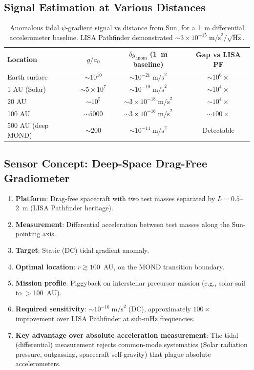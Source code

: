 \documentclass[11pt]{article}
\theoremstyle{definition}
\theoremstyle{remark}
\newcommand{\ee}[1]{\times10^{#1}}
\begin{document}
\subsection{Signal Estimation at Various Distances}

\begin{table}[H]
\centering
\small
\begin{tabular}{@{}lccc@{}}
\toprule
Location & $g/a_0$ & $\delta g_{\mathrm{anom}}$
  (1~m baseline) & Gap vs LISA PF \\
\midrule
Earth surface & $\sim 10^{10}$ & $\sim 10^{-21}\;\mathrm{m/s}^2$
  & $\sim 10^{6}\times$ \\
1 AU (Solar) & $\sim 5\ee{7}$ & $\sim 10^{-19}\;\mathrm{m/s}^2$
  & $\sim 10^{4}\times$ \\
20 AU & $\sim 10^{5}$ & $\sim 3\ee{-18}\;\mathrm{m/s}^2$
  & $\sim 10^{4}\times$ \\
100 AU & $\sim 5000$ & $\sim 3\ee{-16}\;\mathrm{m/s}^2$
  & $\sim 100\times$ \\
500 AU (deep MOND) & $\sim 200$ & $\sim 10^{-14}\;\mathrm{m/s}^2$
  & Detectable \\
\bottomrule
\end{tabular}
\caption{Anomalous tidal $\psi$-gradient signal vs distance from Sun,
  for a 1~m differential accelerometer baseline.  LISA Pathfinder
  demonstrated $\sim 3\ee{-15}\;\mathrm{m/s}^2/\sqrt{\mathrm{Hz}}$.}
\label{tab:tidal}
\end{table}

\subsection{Sensor Concept: Deep-Space Drag-Free Gradiometer}

\begin{enumerate}[nosep]
\item \textbf{Platform}: Drag-free spacecraft with two test masses
  separated by $L = 0.5$--2~m (LISA Pathfinder heritage).
\item \textbf{Measurement}: Differential acceleration between
  test masses along the Sun-pointing axis.
\item \textbf{Target}: Static (DC) tidal gradient anomaly.
\item \textbf{Optimal location}: $r \gtrsim 100$~AU, on the
  MOND transition boundary.
\item \textbf{Mission profile}: Piggyback on interstellar precursor
  mission (e.g., solar sail to $>$100~AU).
\item \textbf{Required sensitivity}: $\sim 10^{-16}\;\mathrm{m/s}^2$
  (DC), approximately $100\times$ improvement over LISA Pathfinder
  at sub-mHz frequencies.
\item \textbf{Key advantage over absolute acceleration measurement}:
  The tidal (differential) measurement rejects common-mode
  systematics (Solar radiation pressure, outgassing, spacecraft
  self-gravity) that plague absolute accelerometers.
\end{enumerate}
\end{document}
